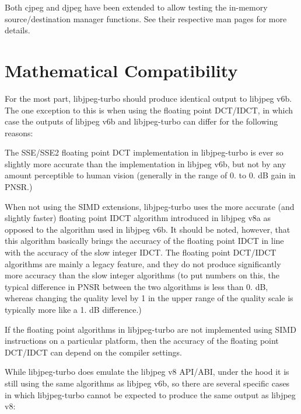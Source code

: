 Both cjpeg and djpeg have been extended to allow testing the in-\/memory source/destination manager functions. See their respective man pages for more details.

\section*{Mathematical Compatibility }

For the most part, libjpeg-\/turbo should produce identical output to libjpeg v6b. The one exception to this is when using the floating point D\+C\+T/\+I\+D\+CT, in which case the outputs of libjpeg v6b and libjpeg-\/turbo can differ for the following reasons\+:


\begin{DoxyItemize}
\item The S\+S\+E/\+S\+S\+E2 floating point D\+CT implementation in libjpeg-\/turbo is ever so slightly more accurate than the implementation in libjpeg v6b, but not by any amount perceptible to human vision (generally in the range of 0. to 0. dB gain in P\+N\+SR.)
\item When not using the S\+I\+MD extensions, libjpeg-\/turbo uses the more accurate (and slightly faster) floating point I\+D\+CT algorithm introduced in libjpeg v8a as opposed to the algorithm used in libjpeg v6b. It should be noted, however, that this algorithm basically brings the accuracy of the floating point I\+D\+CT in line with the accuracy of the slow integer I\+D\+CT. The floating point D\+C\+T/\+I\+D\+CT algorithms are mainly a legacy feature, and they do not produce significantly more accuracy than the slow integer algorithms (to put numbers on this, the typical difference in P\+N\+SR between the two algorithms is less than 0. dB, whereas changing the quality level by 1 in the upper range of the quality scale is typically more like a 1. dB difference.)
\item If the floating point algorithms in libjpeg-\/turbo are not implemented using S\+I\+MD instructions on a particular platform, then the accuracy of the floating point D\+C\+T/\+I\+D\+CT can depend on the compiler settings.
\end{DoxyItemize}

While libjpeg-\/turbo does emulate the libjpeg v8 A\+P\+I/\+A\+BI, under the hood it is still using the same algorithms as libjpeg v6b, so there are several specific cases in which libjpeg-\/turbo cannot be expected to produce the same output as libjpeg v8\+:


